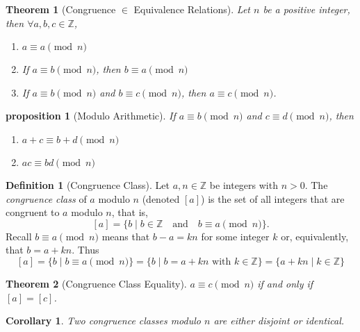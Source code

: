 \documentclass{article}
\newtheorem{theorem}{Theorem}[section]
\newtheorem{corollary}{Corollary}[section]
\newtheorem{proposition}{Proposition}[section]
\newtheorem{proposition}{proposition}[section]
\theoremstyle{definition}
\newtheorem{definition}{Definition}[section]
\theoremstyle{remark}
\begin{document}
\begin{theorem}[Congruence $\in$ Equivalence Relations]
Let $n$ be a positive integer, then $\forall a,b,c \in \mathbb{Z}$,
\begin{enumerate}
\item $ a \equiv a \pmod{n}$
\item If $ a \equiv b  \pmod{n}$, then $ b \equiv a \pmod{n}$
\item If $ a \equiv b \pmod{n}$ and $ b \equiv c \pmod{n}$, then $ a \equiv c \pmod{n}$.
\end{enumerate}

\end{theorem}





\begin{proposition}[Modulo Arithmetic]\label{prp:mod_arithmetic}
If $ a \equiv b \pmod{n}$ and $ c \equiv d \pmod{n}$, then 
\begin{enumerate}
\item $ a+c \equiv b+d \pmod{n}$
\item $ ac \equiv bd \pmod{n}$
\end{enumerate}
\end{proposition}





\begin{definition}[Congruence Class]
Let $a, n \in \mathbb{Z}$ be integers with $n > 0$. The \textit{congruence class} of $a$ modulo $n$ (denoted $[a]$) is the set of all integers that are congruent to $a$ modulo $n$, that is,
\[
[a] = \{b \mid b \in \mathbb{Z} \quad \text{and} \quad b \equiv a \pmod{n} \}.
\]
Recall $b \equiv a \pmod{n}$ means that $b - a = kn$ for some integer $k$ or, equivalently, that $b = a + kn$. Thus
\[
[a] = \{b \mid b \equiv a \pmod{n} \} = \{b \mid b = a + kn \text{ with } k \in \mathbb{Z} \} = \{a + kn \mid k \in \mathbb{Z} \}
\]
\end{definition}


\begin{theorem}[Congruence Class Equality]\label{thm:congruence_class_equality}
$a \equiv c \pmod{n}$ if and only if $[a] = [c]$.

\end{theorem}





\begin{corollary}\label{cor:congruence_classes_disjoint}
Two congruence classes modulo $n$ are either disjoint or identical.
\end{corollary}
\end{document}
